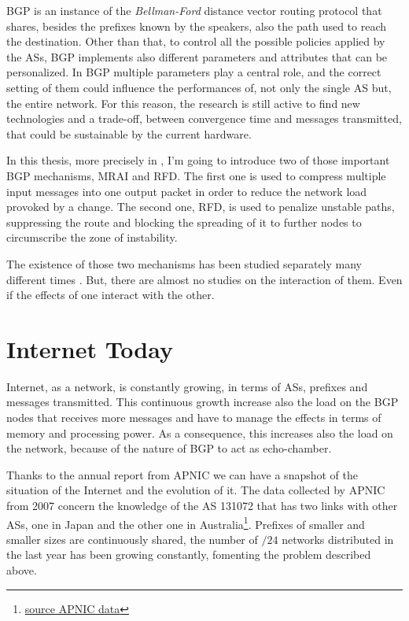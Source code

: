 \ac{BGP} is an instance of the \textit{Bellman-Ford} distance vector routing
protocol that shares, besides the prefixes known by the speakers, also the
path used to reach the destination.
Other than that, to control all the possible policies applied by the \acp{AS},
\ac{BGP} implements also different parameters and attributes that can be
personalized.
In \ac{BGP} multiple parameters play a central role, and the correct setting
of them could influence the performances of, not only the single \ac{AS} but,
the entire network.
For this reason, the research is still active to find new technologies and
a trade-off, between convergence time and messages transmitted, that could
be sustainable by the current hardware.

In this thesis, more precisely in , I'm going to introduce
two of those important \ac{BGP} mechanisms, \ac{MRAI} and \ac{RFD}.
The first one is used to compress multiple input messages into one
output packet in order to reduce the network load provoked by a change.
The second one, \ac{RFD}, is used to penalize unstable paths, suppressing
the route and blocking the spreading of it to further nodes to circumscribe
the zone of instability.

The existence of those two mechanisms has been studied separately many different
times \cite{fabrikant2011there,daggitt2018rate,qiu2005optimal,gray2020bgp}.
But, there are almost no studies on the interaction of them.
Even if the effects of one interact with the other.

\section{Internet Today}
\label{sec:internet_today}

Internet, as a network, is constantly growing, in terms of \acp{AS}, prefixes
and messages transmitted.
This continuous growth increase also the load on the \ac{BGP} nodes that
receives more messages and have to manage the effects in terms of memory
and processing power.
As a consequence, this increases also the load on the network, because of the
nature of \ac{BGP} to act as echo-chamber.

Thanks to the annual report from \ac{APNIC} we can have a snapshot of
the situation of the Internet and the evolution of it.
The data collected by \ac{APNIC} from \num{2007} concern the knowledge
of the \ac{AS} 131072 that has two links with other \acp{AS}, one in Japan and
the other one in Australia\footnote{\href{https://blog.apnic.net/2021/01/05/bgp-in-2020-the-bgp-table/}{source APNIC data}}.
Prefixes of smaller and smaller sizes are continuously shared, the number of
$/24$ networks distributed in the last year has been growing constantly,
fomenting the problem described above.

